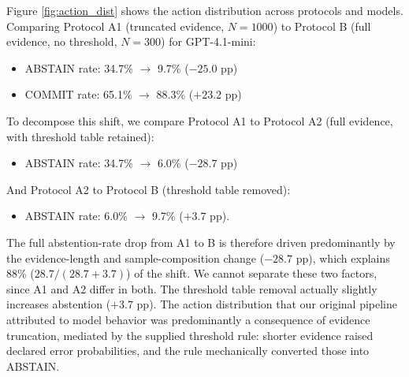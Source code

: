 \documentclass[11pt]{article}
\begin{document}
Figure \ref{fig:action_dist} shows the action distribution across protocols and models. Comparing Protocol A1 (truncated evidence, $N=1000$) to Protocol B (full evidence, no threshold, $N=300$) for GPT-4.1-mini:
\begin{itemize}
    \item ABSTAIN rate: 34.7\% $\rightarrow$ 9.7\% ($-25.0$ pp)
    \item COMMIT rate: 65.1\% $\rightarrow$ 88.3\% ($+23.2$ pp)
\end{itemize}

To decompose this shift, we compare Protocol A1 to Protocol A2 (full evidence, with threshold table retained):
\begin{itemize}
    \item ABSTAIN rate: 34.7\% $\rightarrow$ 6.0\% ($-28.7$ pp)
\end{itemize}

And Protocol A2 to Protocol B (threshold table removed):
\begin{itemize}
    \item ABSTAIN rate: 6.0\% $\rightarrow$ 9.7\% ($+3.7$ pp).
\end{itemize}

The full abstention-rate drop from A1 to B is therefore driven predominantly by the evidence-length and sample-composition change ($-28.7$ pp), which explains 88\% ($28.7 / (28.7 + 3.7)$) of the shift. We cannot separate these two factors, since A1 and A2 differ in both. The threshold table removal actually slightly increases abstention ($+3.7$ pp). The action distribution that our original pipeline attributed to model behavior was predominantly a consequence of evidence truncation, mediated by the supplied threshold rule: shorter evidence raised declared error probabilities, and the rule mechanically converted those into ABSTAIN.
\end{document}
